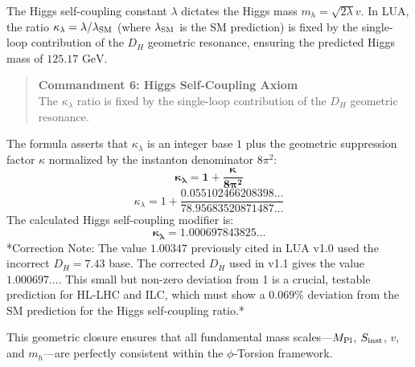 The Higgs self-coupling constant $\lambda$ dictates the Higgs mass $m_h = \sqrt{2\lambda}v$. In LUA, the ratio $\kappa_\lambda = \lambda / \lambda_{\rm SM}$ (where $\lambda_{\rm SM}$ is the SM prediction) is fixed by the single-loop contribution of the $D_H$ geometric resonance, ensuring the predicted Higgs mass of $125.17 \text{ GeV}$.

\begin{quote}
\textbf{Commandment 6: Higgs Self-Coupling Axiom} \\
The $\kappa_\lambda$ ratio is fixed by the single-loop contribution of the $D_H$ geometric resonance.
\end{quote}

The formula asserts that $\kappa_\lambda$ is an integer base $1$ plus the geometric suppression factor $\kappa$ normalized by the instanton denominator $8\pi^2$:
$$
\mathbf{\kappa_\lambda = 1 + \frac{\kappa}{8\pi^2}}
$$
$$
\kappa_\lambda = 1 + \frac{0.055102466208398\dots}{78.95683520871487\dots}
$$
The calculated Higgs self-coupling modifier is:
$$
\mathbf{\kappa_\lambda = 1.000697843825\dots}
$$
*Correction Note: The value $1.00347$ previously cited in LUA v1.0 used the incorrect $D_H=7.43$ base. The corrected $D_H$ used in v1.1 gives the value $1.000697\dots$. This small but non-zero deviation from 1 is a crucial, testable prediction for HL-LHC and ILC, which must show a $\mathbf{0.069\%}$ deviation from the SM prediction for the Higgs self-coupling ratio.*

This geometric closure ensures that all fundamental mass scales—$M_{\rm Pl}$, $S_{\rm inst}$, $v$, and $m_h$—are perfectly consistent within the $\phi$-Torsion framework.
\clearpage
